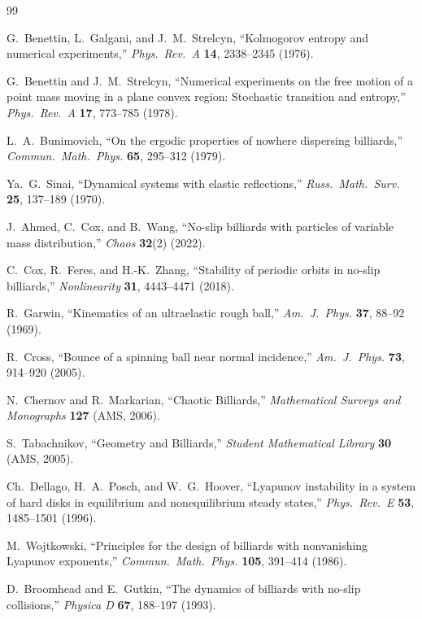 \documentclass[aps,prd,twocolumn,superscriptaddress,nofootinbib,floatfix]{revtex4-2}
\begin{document}
\begin{thebibliography}{99}

G.~Benettin, L.~Galgani, and J.~M.~Strelcyn,
``Kolmogorov entropy and numerical experiments,''
\textit{Phys.\ Rev.\ A} \textbf{14}, 2338--2345 (1976).

G.~Benettin and J.~M.~Strelcyn,
``Numerical experiments on the free motion of a point mass moving in a plane convex region: Stochastic transition and entropy,''
\textit{Phys.\ Rev.\ A} \textbf{17}, 773--785 (1978).

L.~A.~Bunimovich,
``On the ergodic properties of nowhere dispersing billiards,''
\textit{Commun.\ Math.\ Phys.} \textbf{65}, 295--312 (1979).

Ya.~G.~Sinai,
``Dynamical systems with elastic reflections,''
\textit{Russ.\ Math.\ Surv.} \textbf{25}, 137--189 (1970).

J.~Ahmed, C.~Cox, and B.~Wang,
``No-slip billiards with particles of variable mass distribution,''
\textit{Chaos} \textbf{32}(2) (2022).

C.~Cox, R.~Feres, and H.-K.~Zhang,
``Stability of periodic orbits in no-slip billiards,''
\textit{Nonlinearity} \textbf{31}, 4443--4471 (2018).

R.~Garwin,
``Kinematics of an ultraelastic rough ball,''
\textit{Am.\ J.\ Phys.} \textbf{37}, 88--92 (1969).

R.~Cross,
``Bounce of a spinning ball near normal incidence,''
\textit{Am.\ J.\ Phys.} \textbf{73}, 914--920 (2005).


N.~Chernov and R.~Markarian,
``Chaotic Billiards,''
\textit{Mathematical Surveys and Monographs} \textbf{127} (AMS, 2006).

S.~Tabachnikov,
``Geometry and Billiards,''
\textit{Student Mathematical Library} \textbf{30} (AMS, 2005).

Ch.~Dellago, H.~A.~Posch, and W.~G.~Hoover,
``Lyapunov instability in a system of hard disks in equilibrium and nonequilibrium steady states,''
\textit{Phys.\ Rev.\ E} \textbf{53}, 1485--1501 (1996).

M.~Wojtkowski,
``Principles for the design of billiards with nonvanishing Lyapunov exponents,''
\textit{Commun.\ Math.\ Phys.} \textbf{105}, 391--414 (1986).

D.~Broomhead and E.~Gutkin,
``The dynamics of billiards with no-slip collisions,''
\textit{Physica D} \textbf{67}, 188--197 (1993).


\end{thebibliography}
\end{document}
